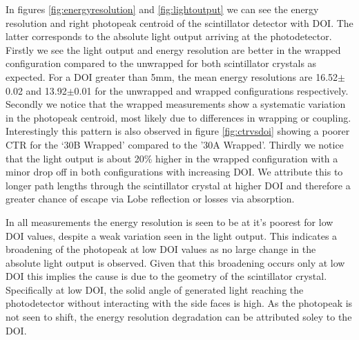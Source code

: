 In figures \ref{fig:energyresolution} and \ref{fig:lightoutput} we can see the energy resolution and right photopeak centroid of the scintillator detector with DOI. The latter corresponds to the absolute light output arriving at the photodetector. Firstly we see the light output and energy resolution are better in the wrapped configuration compared to the unwrapped for both scintillator crystals as expected. For a DOI greater than 5mm, the mean energy resolutions are 16.52$\pm$0.02 and 13.92$\pm$0.01 for the unwrapped and wrapped configurations respectively. Secondly we notice that the wrapped measurements show a systematic variation in the photopeak centroid, most likely due to differences in wrapping or coupling. Interestingly this pattern is also observed in figure \ref{fig:ctrvsdoi} showing a poorer CTR for the `30B Wrapped' compared to the '30A Wrapped'. Thirdly we notice that the light output is about 20\% higher in the wrapped configuration with a minor drop off in both configurations with increasing DOI. We attribute this to longer path lengths through the scintillator crystal at higher DOI and therefore a greater chance of escape via Lobe reflection\cite{Janecek_Moses_2010} or losses via absorption.

In all measurements the energy resolution is seen to be at it's poorest for low DOI values, despite a weak variation seen in the light output. This indicates a broadening of the photopeak at low DOI values as no large change in the absolute light output is observed. Given that this broadening occurs only at low DOI this implies the cause is due to the geometry of the scintillator crystal. Specifically at low DOI, the solid angle of generated light reaching the photodetector without interacting with the side faces is high. As the photopeak is not seen to shift, the energy resolution degradation can be attributed soley to the DOI.